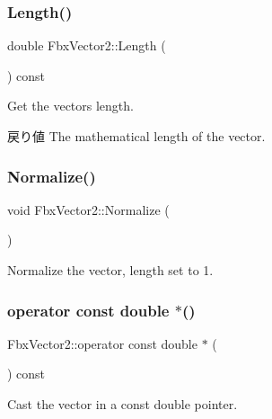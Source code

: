 \subsubsection{\texorpdfstring{Length()}{Length()}}
{\footnotesize\ttfamily double Fbx\+Vector2\+::\+Length (\begin{DoxyParamCaption}{ }\end{DoxyParamCaption}) const}

Get the vector\textquotesingle{}s length. \begin{DoxyReturn}{戻り値}
The mathematical length of the vector. 
\end{DoxyReturn}
\mbox{\label{class_fbx_vector2_a40ac8ab130c716a8ecf30634a168751f}} 
\subsubsection{\texorpdfstring{Normalize()}{Normalize()}}
{\footnotesize\ttfamily void Fbx\+Vector2\+::\+Normalize (\begin{DoxyParamCaption}{ }\end{DoxyParamCaption})}



Normalize the vector, length set to 1. 

\mbox{\label{class_fbx_vector2_aa3d10afdd6d8efcf92a5c19132130f66}} 
\subsubsection{\texorpdfstring{operator const double $\ast$()}{operator const double *()}}
{\footnotesize\ttfamily Fbx\+Vector2\+::operator const double $\ast$ (\begin{DoxyParamCaption}{ }\end{DoxyParamCaption}) const}



Cast the vector in a const double pointer. 

\mbox{\label{class_fbx_vector2_ada2a29fdcddde9235505716bd2b2d756}} 
